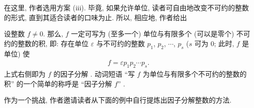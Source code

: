在这里, 作者选用方案 (iii). 毕竟, 如果允许单位, 读者可自由地改变不可约的整数的形式, 直到其适合读者的口味为止. 所以, 相应地, 作者给出
\begin{definition}
    设整数 $f \neq 0$. 那么, $f$ 一定可写为 (至多一个) 单位与有限多个 (可以是零个) 不可约的整数的积, 即: 存在单位 $\varepsilon$ 与不可约的整数 $p_1$, $p_2$, $\cdots$, $p_s$ ($s$ 可为 $0$; 此时, $f$ 是单位) 使
    \begin{align*}
        f = \varepsilon p_1 p_2 \cdots p_s.
    \end{align*}
    上式右侧即为 $f$ 的因子分解 . 动词短语 ``写 $f$ 为单位与有限多个不可约的整数的积'' 的一个简单的称呼是 ``因子分解 $f$'' .
\end{definition}

作为一个挑战, 作者邀请读者从下面的例中自行提炼出因子分解整数的方法.

